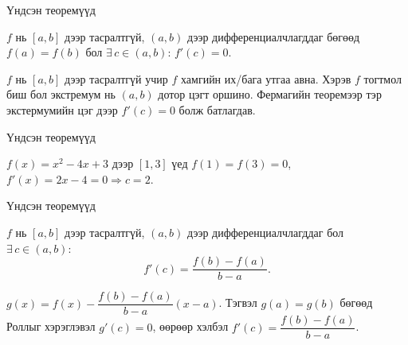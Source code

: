 \begin{frame}[allowframebreaks]{Үндсэн теоремүүд}
\begin{theorem}[Ролл]
$f$ нь $[a,b]$ дээр тасралтгүй, $(a,b)$ дээр дифференциалчлагддаг бөгөөд $f(a)=f(b)$ бол $\exists\,c\in(a,b)$: $f'(c)=0$.
\end{theorem}

\begin{prof}
$f$ нь $[a,b]$ дээр тасралтгүй учир $f$ хамгийн их/бага утгаа авна. Хэрэв $f$ тогтмол биш бол экстремум нь $(a,b)$ дотор цэгт оршино. Фермагийн теоремээр тэр экстермумийн цэг дээр $f'(c)=0$ болж батлагдав.
\end{prof}

\begin{center}
\begin{fitbox}\end{fitbox}
\end{center}
\end{frame}

\begin{frame}[allowframebreaks]{Үндсэн теоремүүд}
\begin{example}
$f(x)=x^2-4x+3$ дээр $[1,3]$ үед $f(1)=f(3)=0$, $f'(x)=2x-4=0\Rightarrow c=2$.
\end{example}
\end{frame}

\begin{frame}[allowframebreaks]{Үндсэн теоремүүд}
\begin{theorem}
$f$ нь $[a,b]$ дээр тасралтгүй, $(a,b)$ дээр дифференциалчлагддаг бол $\exists\,c\in(a,b)$:
\[
f'(c)=\frac{f(b)-f(a)}{\,b-a\,}.
\]
\end{theorem}

\begin{prof}
$g(x)=f(x)-\dfrac{f(b)-f(a)}{b-a}(x-a)$. Тэгвэл $g(a)=g(b)$ бөгөөд Роллыг хэрэглэвэл $g'(c)=0$, өөрөөр хэлбэл $f'(c)=\dfrac{f(b)-f(a)}{b-a}$.
\end{prof}
\end{frame}

